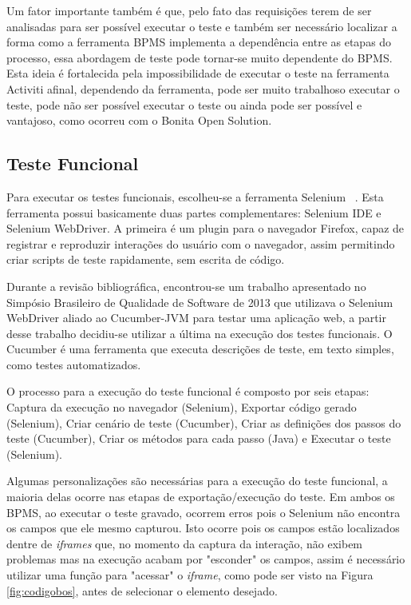 \documentclass[12pt]{article}
\begin{document}
Um fator importante também é que, pelo fato das requisições terem de ser analisadas para ser possível executar o teste e também ser necessário localizar a forma como a ferramenta BPMS implementa a dependência entre as etapas do processo, essa abordagem de teste pode tornar-se muito dependente do BPMS. Esta ideia é fortalecida pela impossibilidade de executar o teste na ferramenta Activiti afinal, dependendo da ferramenta, pode ser muito trabalhoso executar o teste, pode não ser possível executar o teste ou ainda pode ser possível e vantajoso, como ocorreu com o Bonita Open Solution.

\subsection{Teste Funcional}
Para executar os testes funcionais, escolheu-se a ferramenta Selenium ~\cite{SELENIUM}. Esta ferramenta possui basicamente duas partes complementares: Selenium IDE e Selenium WebDriver. A primeira é um plugin para o navegador Firefox, capaz de registrar e reproduzir interações do usuário com o navegador, assim permitindo criar scripts de teste rapidamente, sem escrita de código.

Durante a revisão bibliográfica, encontrou-se um trabalho apresentado no Simpósio Brasileiro de Qualidade de Software de 2013 \cite{sbqs2013} que utilizava o Selenium WebDriver aliado ao Cucumber-JVM \cite{CUCUMBER} para testar uma aplicação web, a partir desse trabalho decidiu-se utilizar a última na execução dos testes funcionais. O Cucumber é uma ferramenta que executa descrições de teste, em texto simples, como testes automatizados.

O processo para a execução do teste funcional é composto por seis etapas: Captura da execução no navegador (Selenium), Exportar código gerado (Selenium), Criar cenário de teste (Cucumber), Criar as definições dos passos do teste (Cucumber), Criar os métodos para cada passo (Java) e Executar o teste (Selenium).

Algumas personalizações são necessárias para a execução do teste funcional, a maioria delas ocorre nas etapas de exportação/execução do teste. Em ambos os BPMS, ao executar o teste gravado, ocorrem erros pois o Selenium não encontra os campos que ele mesmo capturou. Isto ocorre pois os campos estão localizados dentre de \emph{iframes} que, no momento da captura da interação, não exibem problemas mas na execução acabam por "esconder" os campos, assim é necessário utilizar uma função para "acessar" o \emph{iframe}, como pode ser visto na Figura \ref{fig:codigobos}, antes de selecionar o elemento desejado.
\end{document}
